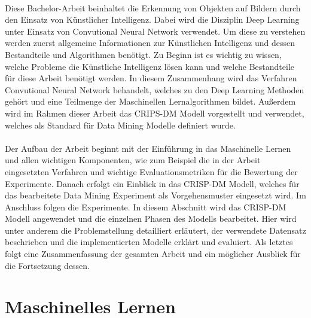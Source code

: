 \documentclass[12pt]{scrreprt}
\begin{document}
	\\
Diese Bachelor-Arbeit beinhaltet die Erkennung von Objekten auf Bildern durch den Einsatz von Künstlicher Intelligenz. Dabei wird die Disziplin Deep Learning unter Einsatz von Convutional Neural Network verwendet. Um diese zu verstehen werden zuerst allgemeine Informationen zur Künstlichen Intelligenz und dessen Bestandteile und Algorithmen benötigt. Zu Beginn ist es wichtig zu wissen, welche Probleme die Künstliche Intelligenz lösen kann und welche Bestandteile für diese Arbeit benötigt werden. In diesem Zusammenhang wird das Verfahren Convutional Neural Network behandelt, welches zu den Deep Learning Methoden gehört und eine Teilmenge der Maschinellen Lernalgorithmen bildet. Außerdem wird im Rahmen dieser Arbeit das CRIPS-DM Modell vorgestellt und verwendet, welches als Standard für Data Mining Modelle definiert wurde.\\
\\
Der Aufbau der Arbeit beginnt mit der Einführung in das Maschinelle Lernen und allen wichtigen Komponenten, wie zum Beispiel die in der Arbeit eingesetzten Verfahren und wichtige Evaluationsmetriken für die Bewertung der Experimente. Danach erfolgt ein Einblick in das CRISP-DM Modell, welches für das bearbeitete Data Mining Experiment als Vorgehensmuster eingesetzt wird. Im Anschluss folgen die Experimente. In diesem Abschnitt wird das CRISP-DM Modell angewendet und die einzelnen Phasen des Modells bearbeitet. Hier wird unter anderem die Problemstellung detailliert erläutert, der verwendete Datensatz beschrieben und die implementierten Modelle erklärt und evaluiert. Als letztes folgt eine Zusammenfassung der gesamten Arbeit und ein möglicher Ausblick für die Fortsetzung dessen.
	
\newpage
\chapter{Maschinelles Lernen}
	
\end{document}
